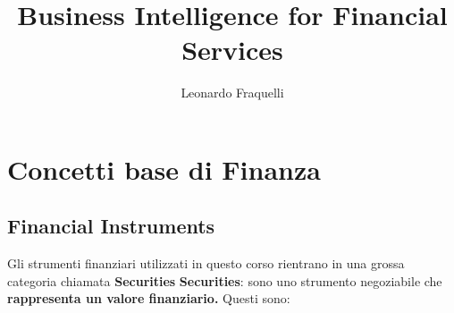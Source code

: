 \documentclass[a4paper,11pt]{report}
\title{ Business Intelligence for Financial Services}
\author {Leonardo Fraquelli }
\begin{document}
\maketitle


\tableofcontents{}
{%



\part{Concetti base di Finanza}
\chapter{Financial Instruments}
Gli strumenti finanziari utilizzati in questo corso rientrano in una grossa categoria chiamata {\bfseries Securities} \newline
{\bfseries Securities}: sono uno strumento negoziabile che {\bfseries rappresenta un valore finanziario.} \newline
Questi sono: 
\begin{description}    %


\end{description}}
\end{document}
